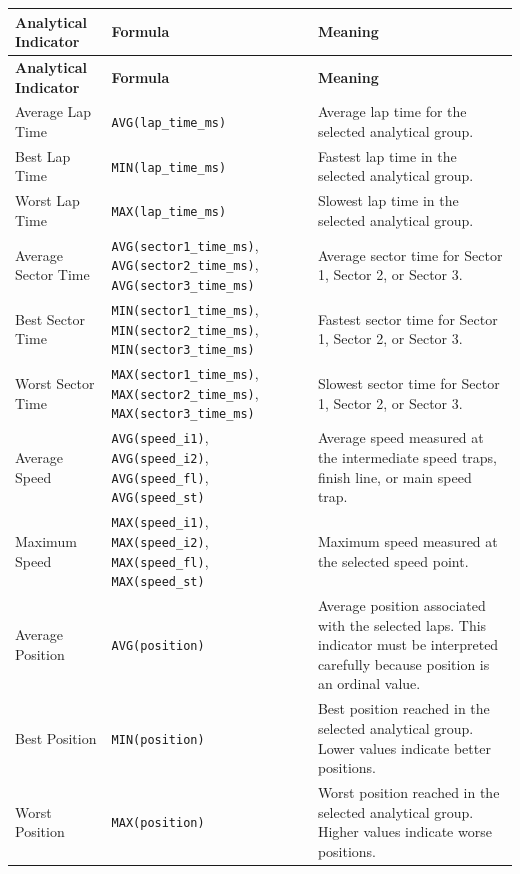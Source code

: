 \documentclass[a4paper,11pt]{article}
\begin{document}
	\begin{longtable}{|p{4.5cm}|p{5.2cm}|p{6cm}|}
		\hline
		\textbf{Analytical Indicator} & \textbf{Formula} & \textbf{Meaning} \\
		\hline
		\endfirsthead
		
		\hline
		\textbf{Analytical Indicator} & \textbf{Formula} & \textbf{Meaning} \\
		\hline
		\endhead
		
		Average Lap Time
		& \texttt{AVG(lap\_time\_ms)}
		& Average lap time for the selected analytical group. \\
		\hline
		
		Best Lap Time
		& \texttt{MIN(lap\_time\_ms)}
		& Fastest lap time in the selected analytical group. \\
		\hline
		
		Worst Lap Time
		& \texttt{MAX(lap\_time\_ms)}
		& Slowest lap time in the selected analytical group. \\
		\hline
		
		Average Sector Time
		& \texttt{AVG(sector1\_time\_ms)}, \texttt{AVG(sector2\_time\_ms)}, \texttt{AVG(sector3\_time\_ms)}
		& Average sector time for Sector 1, Sector 2, or Sector 3. \\
		\hline
		
		Best Sector Time
		& \texttt{MIN(sector1\_time\_ms)}, \texttt{MIN(sector2\_time\_ms)}, \texttt{MIN(sector3\_time\_ms)}
		& Fastest sector time for Sector 1, Sector 2, or Sector 3. \\
		\hline
		
		Worst Sector Time
		& \texttt{MAX(sector1\_time\_ms)}, \texttt{MAX(sector2\_time\_ms)}, \texttt{MAX(sector3\_time\_ms)}
		& Slowest sector time for Sector 1, Sector 2, or Sector 3. \\
		\hline
		
		Average Speed
		& \texttt{AVG(speed\_i1)}, \texttt{AVG(speed\_i2)}, \texttt{AVG(speed\_fl)}, \texttt{AVG(speed\_st)}
		& Average speed measured at the intermediate speed traps, finish line, or main speed trap. \\
		\hline
		
		Maximum Speed
		& \texttt{MAX(speed\_i1)}, \texttt{MAX(speed\_i2)}, \texttt{MAX(speed\_fl)}, \texttt{MAX(speed\_st)}
		& Maximum speed measured at the selected speed point. \\
		\hline
		
		Average Position
		& \texttt{AVG(position)}
		& Average position associated with the selected laps. This indicator must be interpreted
		carefully because position is an ordinal value. \\
		\hline
		
		Best Position
		& \texttt{MIN(position)}
		& Best position reached in the selected analytical group. Lower values indicate better positions. \\
		\hline
		
		Worst Position
		& \texttt{MAX(position)}
		& Worst position reached in the selected analytical group. Higher values indicate worse positions. \\
		\hline
		
	\end{longtable}
	
\end{document}
